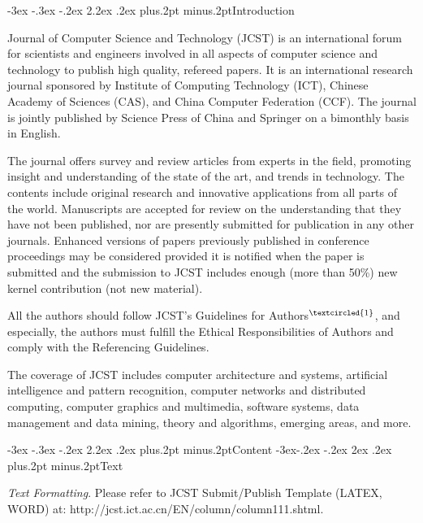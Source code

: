 \documentclass[twoside]{article}
\makeatletter
\def\section{\@startsection{section}{1}{\z@}%
 {-3ex \@plus -.3ex \@minus -.2ex}%
 {2.2ex \@plus.2ex}%
{\normalfont\normalsize\protect\baselineskip=14.5pt plus.2pt minus.2pt\bfseries}}
\def\subsection{\@startsection{subsection}{2}{\z@}%
 {-3ex\@plus -.2ex \@minus -.2ex}%
 {2ex \@plus.2ex}%
{\normalfont\normalsize\protect\baselineskip=12.5pt plus.2pt minus.2pt\bfseries}}
\makeatother
\begin{document}
\begin{multicols}{2}

\section{Introduction}

Journal of Computer Science and Technology (JCST) is an international forum for scientists and engineers involved in all aspects of computer science and technology to publish high quality, refereed papers. It is an international research journal sponsored by Institute of Computing Technology (ICT), Chinese Academy of Sciences (CAS), and China Computer Federation (CCF). The journal is jointly published by Science Press of China and Springer on a bimonthly basis in English.

The journal offers survey and review articles from experts in the field, promoting insight and understanding of the state of the art, and trends in technology. The contents include original research and innovative applications from all parts of the world. Manuscripts are accepted for review on the understanding that they have not been published, nor are presently submitted for publication in any other journals. Enhanced versions of papers previously published in conference proceedings may be considered provided it is notified when the paper is submitted and the submission to JCST includes enough (more than 50\%) new kernel contribution (not new material).

All the authors should follow JCST's Guidelines for Authors$^{\footnotesize\textcircled{\tiny1}}$, and especially, the authors must fulfill the Ethical Responsibilities of Authors and comply with the Referencing Guidelines.

The coverage of JCST includes computer architecture and systems, artificial intelligence and pattern recognition, computer networks and distributed computing, computer graphics and multimedia, software systems, data management and data mining, theory and algorithms, emerging areas, and more.

\section{Content}
\subsection{Text}

{\it Text Formatting}. Please refer to JCST Submit/Publish Template (LATEX, WORD) at:  http://jc\-st.ict.ac.cn/EN/column/column111.shtml.


\end{multicols}
\end{document}

